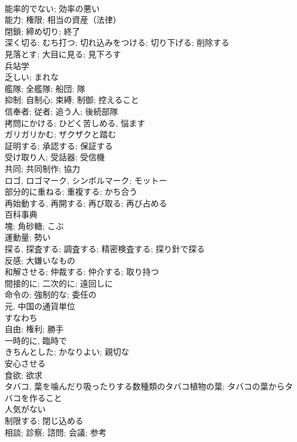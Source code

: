 \documentclass[8pt]{extreport}
\begin{document}
\begin{CJK}{UTF8}{min}
\\	能率的でない; 効率の悪い	
\\	能力; 権限; 相当の資産（法律）	
\\	閉鎖; 締め切り; 終了	
\\	深く切る; むち打つ; 切れ込みをつける; 切り下げる; 削除する	
\\	見落とす; 大目に見る; 見下ろす	
\\	兵站学	
\\	乏しい; まれな	
\\	艦隊; 全艦隊; 船団; 隊	
\\	抑制; 自制心; 束縛; 制御; 控えること	
\\	信奉者; 従者; 追う人; 後続部隊	
\\	拷問にかける; ひどく苦しめる, 悩ます	
\\	ガリガリかむ; ザクザクと踏む	
\\	証明する; 承認する; 保証する	
\\	受け取り人; 受話器; 受信機	
\\	共同; 共同制作; 協力	
\\	ロゴ, ロゴマーク, シンボルマーク; モットー	
\\	部分的に重ねる; 重複する; かち合う	
\\	再始動する, 再開する; 再び取る; 再び占める	
\\	百科事典	
\\	塊; 角砂糖; こぶ	
\\	運動量; 勢い	
\\	探る, 探査する; 調査する; 精密検査する; 探り針で探る	
\\	反感; 大嫌いなもの	
\\	和解させる; 仲裁する; 仲介する; 取り持つ	
\\	間接的に; 二次的に; 遠回しに	
\\	命令の; 強制的な; 委任の	
\\	元, 中国の通貨単位	
\\	すなわち	
\\	自由; 権利; 勝手	
\\	一時的に, 臨時で	
\\	きちんとした; かなりよい; 親切な	
\\	安心させる	
\\	食欲; 欲求	
\\	タバコ, 葉を噛んだり吸ったりする数種類のタバコ植物の葉; タバコの葉からタバコを作ること	
\\	人気がない	
\\	制限する; 閉じ込める	
\\	相談; 診察; 諮問; 会議; 参考	

\end{CJK}
\end{document}

